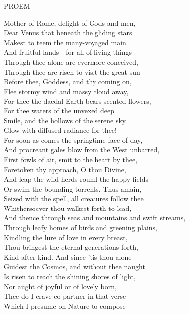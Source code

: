 
PROEM

Mother of Rome, delight of Gods and men,\\
Dear Venus that beneath the gliding stars\\
Makest to teem the many-voyaged main\\
And fruitful lands—for all of living things\\
Through thee alone are evermore conceived,\\
Through thee are risen to visit the great sun—\\
Before thee, Goddess, and thy coming on,\\
Flee stormy wind and massy cloud away,\\
For thee the daedal Earth bears scented flowers,\\
For thee waters of the unvexed deep\\
Smile, and the hollows of the serene sky\\
Glow with diffused radiance for thee!\\
For soon as comes the springtime face of day,\\
And procreant gales blow from the West unbarred,\\
First fowls of air, smit to the heart by thee,\\
Foretoken thy approach, O thou Divine,\\
And leap the wild herds round the happy fields\\
Or swim the bounding torrents. Thus amain,\\
Seized with the spell, all creatures follow thee\\
Whithersoever thou walkest forth to lead,\\
And thence through seas and mountains and swift streams,\\
Through leafy homes of birds and greening plains,\\
Kindling the lure of love in every breast,\\
Thou bringest the eternal generations forth,\\
Kind after kind. And since 'tis thou alone\\
Guidest the Cosmos, and without thee naught\\
Is risen to reach the shining shores of light,\\
Nor aught of joyful or of lovely born,\\
Thee do I crave co-partner in that verse\\
Which I presume on Nature to compose\\

